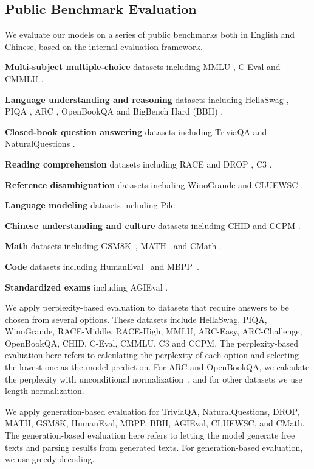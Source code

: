 \subsection{Public Benchmark Evaluation} We evaluate our models on a series of public benchmarks both in English and Chinese, based on the internal evaluation framework. 

\textbf{Multi-subject multiple-choice} datasets including MMLU \citep{mmlu}, C-Eval \citep{ceval} and CMMLU \citep{cmmlu}.

\textbf{Language understanding and reasoning} datasets including HellaSwag \citep{hellaswag}, PIQA \citep{piqa}, ARC \citep{arc}, OpenBookQA \citep{mihaylov2018suit} and BigBench Hard (BBH) \citep{bbh}.

\textbf{Closed-book question answering} datasets including TriviaQA \citep{joshi-etal-2017-triviaqa} and NaturalQuestions \citep{naturalquestions}.

\textbf{Reading comprehension} datasets including RACE \cite{race} and DROP \citep{drop},  C3 \citep{sun2019investigating}.

\textbf{Reference disambiguation} datasets including WinoGrande \cite{sakaguchi2019winogrande} and CLUEWSC \citep{clue}.

\textbf{Language modeling} datasets including Pile \citep{pile}.

\textbf{Chinese understanding and culture} datasets including CHID \citep{chid} and CCPM \citep{li2021ccpm}.

\textbf{Math} datasets including GSM8K~\citep{gsm8k}, MATH~\citep{hendrycks2021measuring} and CMath \citep{wei2023cmath}.

\textbf{Code} datasets including HumanEval~\citep{codex} and MBPP~\citep{mbpp}.

\textbf{Standardized exams} including AGIEval \citep{agieval}.

We apply perplexity-based evaluation to datasets that require answers to be chosen from several options. These datasets include HellaSwag, PIQA, WinoGrande, RACE-Middle, RACE-High, MMLU, ARC-Easy, ARC-Challenge, OpenBookQA, CHID, C-Eval, CMMLU, C3 and CCPM. The perplexity-based evaluation here refers to calculating the perplexity of each option and selecting the lowest one as the model prediction. For ARC and OpenBookQA, we calculate the perplexity with unconditional normalization~\citep{brown2020language}, and for other datasets we use length normalization.

We apply generation-based evaluation for TriviaQA, NaturalQuestions, DROP, MATH, GSM8K, HumanEval, MBPP, BBH, AGIEval, CLUEWSC, and CMath. The generation-based evaluation here refers to letting the model generate free texts and parsing results from generated texts. For generation-based evaluation, we use greedy decoding.

